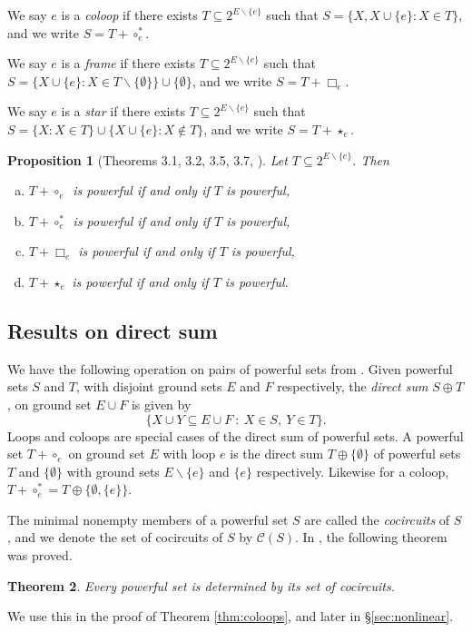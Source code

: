 \documentclass[10pt]{article}
\newtheorem{thm}{Theorem}[section]
\newtheorem{pro}[thm]{Proposition}
\theoremstyle{definition}
\begin{document}
We say $e$ is a \emph{coloop} if there exists $T\subseteq 2^{E\backslash\{e\}}$ such that $S=\{X,X\cup\{e\}:X\in T\}$, and we write $S=T+\circ^*_e$.
	
	We say $e$ is a \emph{frame} if there exists $T\subseteq 2^{E\backslash\{e\}}$ such that $S=\{X\cup\{e\}:X\in T\backslash\{\emptyset\}\}\cup\{\emptyset\}$, and we write $S=T+\Box_e$.
	
	We say $e$ is a \emph{star} if there exists $T\subseteq 2^{E\backslash\{e\}}$ such that $S=\{X:X\in T\}\cup\{X\cup\{e\}:X\notin T\}$, and we write $S=T+\star_e$.
		
	\begin{pro}[Theorems 3.1, 3.2, 3.5, 3.7, \cite{farr2017}]
	  Let $T\subseteq 2^{E\backslash\{e\}}$. Then
	  
	\begin{enumerate}[a)] 
	    \item $T+\circ_e$\, is powerful if and only if $T$ is powerful,
	    
	    \item $T+\circ^*_e$\, is powerful if and only if $T$ is powerful,

	    \item $T+\Box_e$ is powerful if and only if $T$ is powerful,

	    \item $T+\star_e$\; is powerful if and only if $T$ is powerful.
	\end{enumerate}
	\end{pro}
	
\subsection{Results on direct sum}

	We have the following operation on pairs of powerful sets from \cite{farr2017}.  Given powerful sets $S$ and $T$, with disjoint ground sets $E$ and $F$ respectively, the \emph{direct sum}  $S\oplus T$, on ground set $E\cup F$ is given by
\[		\{X\cup Y\subseteq E\cup F~:~X\in S,~ Y\in T	\}.	\]
Loops and coloops are special cases of the direct sum of powerful sets. A powerful set $T+\circ_e$ on ground set $E$ with loop $e$ is the direct sum $T\oplus \{\emptyset\}$ of powerful sets $T$ and $\{\emptyset\}$ with ground sets $E\backslash \{e\}$ and $\{e\}$ respectively. Likewise for a coloop, $T+\circ^*_e= T \oplus \{\emptyset,\{e\}\}$. 


	The minimal nonempty members of a powerful set $S$ are called the \emph{cocircuits} of $S$, and we denote the set of cocircuits of $S$ by $\mathcal{C}(S)$.
	In \cite{farr2017}, the following theorem was proved.
	\begin{thm}\label{thm:cocircuits}
		Every powerful set is determined by its set of cocircuits.
	\end{thm}
	We use this in the proof of Theorem \ref{thm:coloops}, and later in \S \ref{sec:nonlinear}.
	
\end{document}
